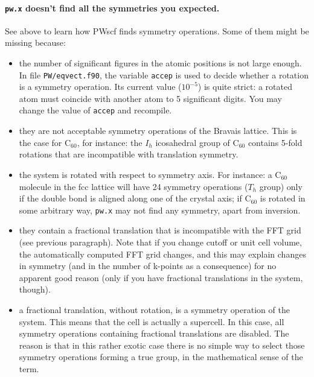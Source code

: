 \documentclass[12pt,a4paper]{article}
\begin{document}
\paragraph{\texttt{pw.x} doesn't find all the symmetries you
           expected.}

See above to learn how PWscf finds symmetry operations.
Some of them might be missing because:
\begin{itemize}
  \item
    the number of significant figures in the atomic positions is not
    large enough.
    In file \texttt{PW/eqvect.f90}, the variable \texttt{accep} is
    used to decide whether a rotation is a symmetry operation.
    Its current value ($10^{-5}$) is quite strict: a rotated atom must
    coincide with another atom to 5 significant digits.
    You may change the value of \texttt{accep} and recompile.
  \item
    they are not acceptable symmetry operations of the Bravais
    lattice.
    This is the case for C$_{60}$, for instance: the $I_h$ icosahedral
    group of C$_{60}$ contains 5-fold rotations that are incompatible
    with translation symmetry.
  \item
    the system is rotated with respect to symmetry axis.
    For instance: a C$_{60}$ molecule in the fcc lattice will have 24
    symmetry operations ($T_h$ group) only if the double bond is
    aligned along one of the crystal axis; if C$_{60}$ is rotated in
    some arbitrary way, \texttt{pw.x} may not find any symmetry, apart
    from inversion.
  \item
    they contain a fractional translation that is incompatible with
    the FFT grid (see previous paragraph).
    Note that if you change cutoff or unit cell volume, the
    automatically computed FFT grid changes, and this may explain
    changes in symmetry (and in the number of k-points as a
    consequence) for no apparent good reason (only if you have
    fractional translations in the system, though).
  \item
    a fractional translation, without rotation, is a symmetry
    operation of the system. This means that the cell is actually 
    a supercell. In this case, all symmetry operations containing 
    fractional translations are disabled.
    The reason is that in this rather exotic case there is no simple
    way to select those symmetry operations forming a true group, in
    the mathematical sense of the term.
\end{itemize}
\end{document}
